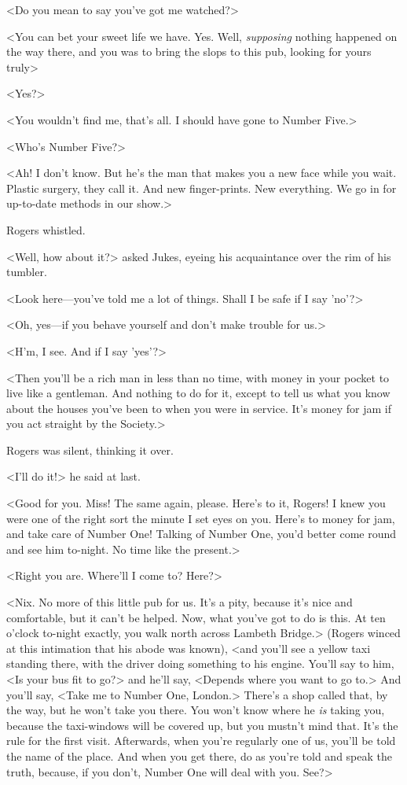 <Do you mean to say you've got me watched?>

<You can bet your sweet life we have. Yes. Well, \emph{supposing} nothing happened on the way there, and you was to bring the slops to this pub, looking for yours truly\longdash>

<Yes?>

<You wouldn't find me, that's all. I should have gone to Number Five.>

<Who's Number Five?>

<Ah! I don't know. But he's the man that makes you a new face while you wait. Plastic surgery, they call it. And new finger-prints. New everything. We go in for up-to-date methods in our show.>

Rogers whistled.

<Well, how about it?> asked Jukes, eyeing his acquaintance over the rim of his tumbler.

<Look here—you've told me a lot of things. Shall I be safe if I say 'no'?>

<Oh, yes—if you behave yourself and don't make trouble for us.>

<H'm, I see. And if I say 'yes'?>

<Then you'll be a rich man in less than no time, with money in your pocket to live like a gentleman. And nothing to do for it, except to tell us what you know about the houses you've been to when you were in service. It's money for jam if you act straight by the Society.>

Rogers was silent, thinking it over.

<I'll do it!> he said at last.

<Good for you. Miss! The same again, please. Here's to it, Rogers! I knew you were one of the right sort the minute I set eyes on you. Here's to money for jam, and take care of Number One! Talking of Number One, you'd better come round and see him to-night. No time like the present.>

<Right you are. Where'll I come to? Here?>

<Nix. No more of this little pub for us. It's a pity, because it's nice and comfortable, but it can't be helped. Now, what you've got to do is this. At ten o'clock to-night exactly, you walk north across Lambeth Bridge.> (Rogers winced at this intimation that his abode was known), <and you'll see a yellow taxi standing there, with the driver doing something to his engine. You'll say to him, <Is your bus fit to go?> and he'll say, <Depends where you want to go to.> And you'll say, <Take me to Number One, London.> There's a shop called that, by the way, but he won't take you there. You won't know where he \emph{is} taking you, because the taxi-windows will be covered up, but you mustn't mind that. It's the rule for the first visit. Afterwards, when you're regularly one of us, you'll be told the name of the place. And when you get there, do as you're told and speak the truth, because, if you don't, Number One will deal with you. See?>

